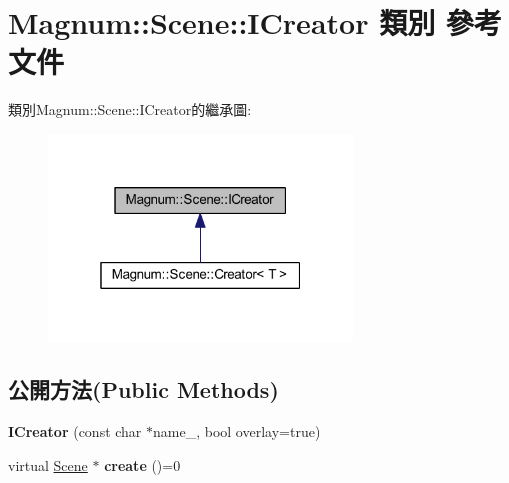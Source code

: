 \hypertarget{class_magnum_1_1_scene_1_1_i_creator}{}\section{Magnum\+:\+:Scene\+:\+:I\+Creator 類別 參考文件}
\label{class_magnum_1_1_scene_1_1_i_creator}


類別\+Magnum\+:\+:Scene\+:\+:I\+Creator的繼承圖\+:\nopagebreak
\begin{figure}[H]
\begin{center}
\leavevmode
\includegraphics[width=229pt]{class_magnum_1_1_scene_1_1_i_creator__inherit__graph}
\end{center}
\end{figure}
\subsection*{公開方法(Public Methods)}
\begin{DoxyCompactItemize}
\item 
{\bfseries I\+Creator} (const char $\ast$name\+\_\+, bool overlay=true)\hypertarget{class_magnum_1_1_scene_1_1_i_creator_ab9b2d38724718182f02aee8ea381c9ec}{}\label{class_magnum_1_1_scene_1_1_i_creator_ab9b2d38724718182f02aee8ea381c9ec}

\item 
virtual \hyperlink{class_magnum_1_1_scene}{Scene} $\ast$ {\bfseries create} ()=0\hypertarget{class_magnum_1_1_scene_1_1_i_creator_afd350256f3578e3d86f786993de6e5da}{}\label{class_magnum_1_1_scene_1_1_i_creator_afd350256f3578e3d86f786993de6e5da}

\end{DoxyCompactItemize}
